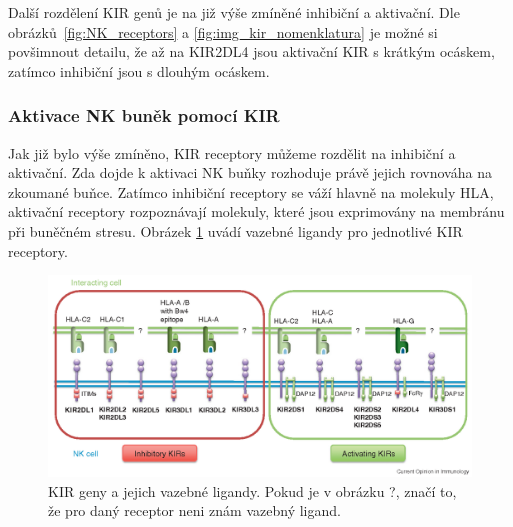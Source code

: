 \documentclass[czech,DP]{thesiskiv}
\numberwithin{equation}{section}
\begin{document}
\noindent
Další rozdělení KIR genů je na již výše zmíněné inhibiční a aktivační. Dle obrázků~\ref{fig:NK_receptors} a  \ref{fig:img_kir_nomenklatura} je možné si povšimnout detailu, že až na KIR2DL4 jsou aktivační KIR s krátkým ocáskem, zatímco inhibiční jsou s dlouhým ocáskem. 

\subsubsection{Aktivace NK buněk pomocí KIR}
Jak již bylo výše zmíněno, KIR receptory můžeme rozdělit na inhibiční a aktivační. Zda dojde k aktivaci NK buňky rozhoduje právě jejich rovnováha na zkoumané buňce. Zatímco inhibiční receptory se váží hlavně na molekuly HLA, aktivační receptory rozpoznávají molekuly, které jsou exprimovány na membránu při buněčném stresu. Obrázek \ref{fig:img_kir_ligand} uvádí vazebné ligandy pro jednotlivé KIR receptory.  

\begin{figure}[H]		
		\centering
		\includegraphics[width=\textwidth]{./img/KIR_nomenklatura2.png}
		\caption{KIR geny a jejich vazebné ligandy. Pokud je v obrázku ?, značí to, že pro daný receptor neni znám vazebný ligand. \cite{KIR_img_nomenklatura}}
		\label{fig:img_kir_ligand}
\end{figure}
\end{document}
